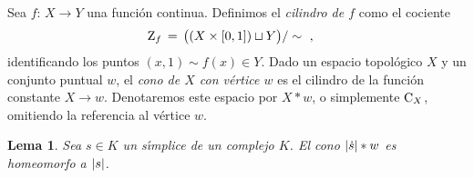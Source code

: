 \theoremstyle{plain}
\newtheorem{lemaConoSobreLasCarasPropias}{Lema}[section]
\newtheorem{lemaRetractoPorDeformacionSimplices}%
	[lemaConoSobreLasCarasPropias]{Lema}
\newtheorem{coroRetractoPorDeformacionComplejos}%
	[lemaConoSobreLasCarasPropias]{Corolario}
\newtheorem{coroExtensionDeHomotopiasEnSubcomplejos}%
	[lemaConoSobreLasCarasPropias]{Corolario}

\theoremstyle{remark}


Sea $f:\,X\rightarrow Y$ una funci\'{o}n continua. Definimos el
\emph{cilindro de $f$} como el cociente
\begin{align*}
	\mathrm{Z}_{f} & \,=\,\big((X\times\left[0,1\right])\sqcup Y\big)/\sim
	\text{ ,}
\end{align*}
%
identificando los puntos $(x,1)\sim f(x)\in Y$. Dado un espacio topol\'{o}gico
$X$ y un conjunto puntual $w$, el \emph{cono de $X$ con v\'{e}rtice $w$} es el
cilindro de la funci\'{o}n constante $X\rightarrow w$. Denotaremos este
espacio por $X*w$, o simplemente $\mathrm{C}_{X}$, omitiendo la referencia al
v\'{e}rtice $w$.

\begin{lemaConoSobreLasCarasPropias}\label{thm:conosobrelascaraspropias}
	Sea $s\in K$ un s\'{\i}mplice de un complejo $K$. El cono
	$\left|\dot{s}\right|*w$ es homeomorfo a $\left|s\right|$.
\end{lemaConoSobreLasCarasPropias}

